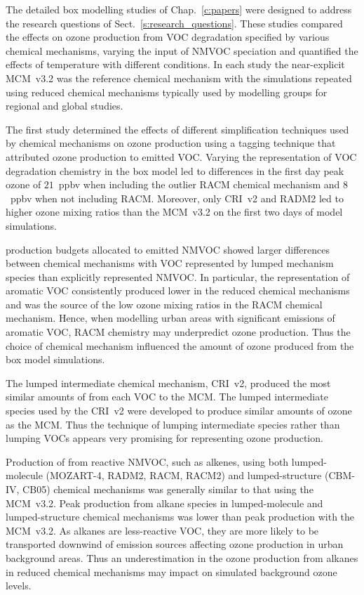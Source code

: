 The detailed box modelling studies of Chap.~\ref{c:papers} were designed to address the research questions of Sect.~\ref{s:research_questions}.
These studies compared the effects on ozone production from VOC degradation specified by various chemical mechanisms, varying the input of NMVOC speciation and quantified the effects of temperature with different  conditions.
In each study the near-explicit MCM~v3.2 was the reference chemical mechanism with the simulations repeated using reduced chemical mechanisms typically used by modelling groups for regional and global studies.

The first study determined the effects of different simplification techniques used by chemical mechanisms on ozone production using a tagging technique that attributed ozone production to emitted VOC.
Varying the representation of VOC degradation chemistry in the box model led to differences in the first day peak ozone of $21$~ppbv when including the outlier RACM chemical mechanism and $8$~ppbv when not including RACM.
Moreover, only CRI~v2 and RADM2 led to higher ozone mixing ratios than the MCM~v3.2 on the first two days of model simulations.

 production budgets allocated to emitted NMVOC showed larger differences between chemical mechanisms with VOC represented by lumped mechanism species than explicitly represented NMVOC.
In particular, the representation of aromatic VOC consistently produced lower  in the reduced chemical mechanisms and was the source of the low ozone mixing ratios in the RACM chemical mechanism.
Hence, when modelling urban areas with significant emissions of aromatic VOC, RACM chemistry may underpredict ozone production.
Thus the choice of chemical mechanism influenced the amount of ozone produced from the box model simulations.

The lumped intermediate chemical mechanism, CRI~v2, produced the most similar amounts of  from each VOC to the MCM.
The lumped intermediate species used by the CRI~v2 were developed to produce similar amounts of ozone as the MCM.
Thus the technique of lumping intermediate species rather than lumping VOCs appears very promising for representing ozone production.

Production of  from reactive NMVOC, such as alkenes, using both lumped-molecule (MOZART-4, RADM2, RACM, RACM2) and lumped-structure (CBM-IV, CB05) chemical mechanisms was generally similar to that using the MCM~v3.2.
Peak  production from alkane species in lumped-molecule and lumped-structure chemical mechanisms was lower than peak  production with the MCM~v3.2.
As alkanes are less-reactive VOC, they are more likely to be transported downwind of emission sources affecting ozone production in urban background areas.
Thus an underestimation in the ozone production from alkanes in reduced chemical mechanisms may impact on simulated background ozone levels.

